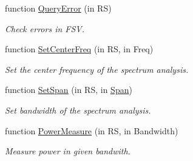 \begin{DoxyCompactItemize}
function \hyperlink{class_c_f_s_v_a4a9f9beafd847d609723d74801a28b2b}{Query\-Error} (in R\-S)
\begin{DoxyCompactList}\small\item\em Check errors in F\-S\-V. \end{DoxyCompactList}\item 
function \hyperlink{class_c_f_s_v_a0450f3cf71b248bb686c8ce4fb28c96a}{Set\-Center\-Freq} (in R\-S, in Freq)
\begin{DoxyCompactList}\small\item\em Set the center frequency of the spectrum analysis. \end{DoxyCompactList}\item 
function \hyperlink{class_c_f_s_v_a5507bb0e128a5412cb0d15eaae371d53}{Set\-Span} (in R\-S, in \hyperlink{class_c_f_s_v_ab6ba1b89aad6e2adfc7ec6206ae0c930}{Span})
\begin{DoxyCompactList}\small\item\em Set bandwidth of the spectrum analysis. \end{DoxyCompactList}\item 
function \hyperlink{class_c_f_s_v_aef5e4bca9a7a36772525e770747f4e15}{Power\-Measure} (in R\-S, in Bandwidth)
\begin{DoxyCompactList}\small\item\em Measure power in given bandwith. \end{DoxyCompactList}\end{DoxyCompactItemize}
